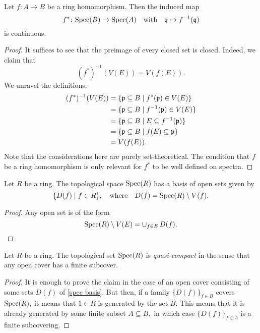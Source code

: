 \begin{prop}
  Let $f \colon A \to B$ be a ring homomorphism. Then the induced map
  \[f^* \colon \text{Spec}(B) \to \text{Spec}(A)
    \quad \text{with} \quad
    \mathfrak q \mapsto f^{-1}(\mathfrak q)\]
  is continuous.
\end{prop}
\begin{proof}
It suffices to see that the preimage of every closed set is closed. Indeed, we claim that
\[ (f^*)^{-1}(V(E)) = V(f(E)).\]
We unravel the definitions:
\begin{align*}
  (f^*)^{-1}(V(E)) & = \{ \mathfrak p \subseteq B \mathrel{|} f^*(\mathfrak p) \in V(E)\} \\
                   & = \{ \mathfrak p \subseteq B \mathrel{|} f^{-1}(\mathfrak p) \in V(E)\} \\
                   & = \{ \mathfrak p \subseteq B \mathrel{|} E \subseteq f^{-1}(\mathfrak p) \} \\
                   & = \{ \mathfrak p \subseteq B \mathrel{|} f(E) \subseteq \mathfrak p\} \\
                   & = V(f(E)).
\end{align*}
Note that the considerations here are purely set-theoretical. The condition that $f$ be a ring homomorphism is only relevant for $f^*$ to be well defined on spectra.
\end{proof}

\begin{prop}
  \label{spec basis}
  Let \(R\) be a ring. The topological space \(\text{Spec}(R)\) has a basis of open sets given by
  \[\{D(f) \mathrel{|} f \in R\}, \quad \text{where} \quad D(f) = \text{Spec}(R) \setminus V(f).\]
\end{prop}
\begin{proof}
  Any open set is of the form
  \[\text{Spec}(R) \setminus V(E) = \operatorname{\cup}_{f \in E} D(f).\]
\end{proof}

\begin{prop}
  \label{spec quasi-compact}
  Let \(R\) be a ring. The topological set \(\text{Spec}(R)\) is \emph{quasi-compact} in the sense that any open cover has a finite subcover.
\end{prop}
\begin{proof}
  It is enough to prove the claim in the case of an open cover consisting of some sets \(D(f)\) of \cref{spec basis}. But then, if a family \(\{D(f)\}_{f \in B}\) covers \(\text{Spec}(R),\) it means that \(1 \in R\) is generated by the set \(B.\) This means that it is already generated by some finite subset \(A \subseteq B,\) in which case \(\{D(f)\}_{f \in A}\) is a finite subcovering.
\end{proof}


